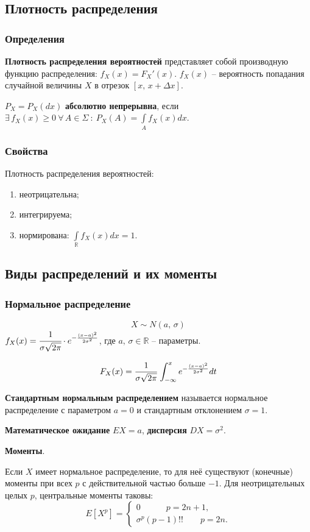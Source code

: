 \documentclass{article}
\newcommand{\R}{\mathbb{R}}
\begin{document}
\subsection{Плотность распределения}
\subsubsection{Определения}
\textbf{Плотность распределения вероятностей} представляет собой производную функцию распределения: $f_X(x)=F_X'(x)$. $f_X(x)$ -- вероятность попадания случайной величины $X$ в отрезок $[x,\,x+\Delta x]$.

$P_X=P_X(dx)$ \textbf{абсолютно непрерывна}, если $\exists\,f_X(x)\geq 0\:\forall\,A\in\Sigma\::\:P_X(A)=\int\limits_A f_X(x)dx$.

\subsubsection{Свойства}
Плотность распределения вероятностей:
\begin{enumerate}
    \item неотрицательна;
    \item интегрируема;
    \item нормирована: $\int\limits_{\R}f_X(x)dx=1$.
\end{enumerate}
\subsection{Виды распределений и их моменты}
\subsubsection{Нормальное распределение}
$$X \sim N(a,\,\sigma)$$
$ f_X(x)=\cfrac{1}{\sigma\sqrt{2\pi}}\cdot e^{-\frac{(x-a)^2}{2\sigma^2}} $, где $a,\,\sigma\in\R$ -- параметры.

$$F_X(x)=\cfrac{1}{\sigma\sqrt{2\pi}}\,\int_{-\infty}^x e^{-\frac{(x-a)^2}{2\sigma^2}}dt$$

\textbf{Стандартным нормальным распределением} называется нормальное распределение с параметром $a=0$ и стандартным отклонением $\sigma=1$.

\textbf{Математическое ожидание} $EX=a$, \textbf{дисперсия} $DX=\sigma^2$.

\textbf{Моменты}.

Если $X$ имеет нормальное распределение, то для неё существуют (конечные) моменты при всех $p$ с действительной частью больше $-1$. Для неотрицательных целых $p$, центральные моменты таковы:
$$ E[X^p]=\begin{cases}0\quad\quad\quad p=2n+1,\\ \sigma^p(p-1)!!\quad\quad p=2n.\end{cases} $$
\end{document}
